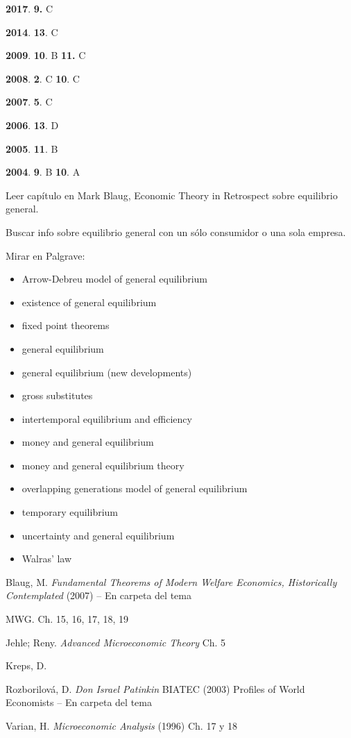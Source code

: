 \documentclass{nuevotema}
\begin{document}
\textbf{2017}. \textbf{9.} C

\textbf{2014}. \textbf{13}. C

\textbf{2009}. \textbf{10}. B \textbf{11.} C

\textbf{2008}. \textbf{2}. C \textbf{10}. C

\textbf{2007}. \textbf{5}. C

\textbf{2006}. \textbf{13}. D

\textbf{2005}. \textbf{11}. B

\textbf{2004}. \textbf{9}. B \textbf{10}. A

Leer capítulo en Mark Blaug, Economic Theory in Retrospect sobre equilibrio general.

Buscar info sobre equilibrio general con un sólo consumidor o una sola empresa.

\bibliografia

Mirar en Palgrave:
\begin{itemize}
	\item Arrow-Debreu model of general equilibrium
	\item existence of general equilibrium
	\item fixed point theorems
	\item general equilibrium
	\item general equilibrium (new developments)
	\item gross substitutes
	\item intertemporal equilibrium and efficiency
	\item money and general equilibrium
	\item money and general equilibrium theory
	\item overlapping generations model of general equilibrium
	\item temporary equilibrium
	\item uncertainty and general equilibrium
	\item Walras' law
\end{itemize}

Blaug, M. \textit{Fundamental Theorems of Modern Welfare Economics, Historically Contemplated} (2007) -- En carpeta del tema

MWG. Ch. 15, 16, 17, 18, 19

Jehle; Reny. \textit{Advanced Microeconomic Theory} Ch. 5

Kreps, D. 

Rozborilová, D. \textit{Don Israel Patinkin} BIATEC (2003) Profiles of World Economists -- En carpeta del tema

Varian, H. \textit{Microeconomic Analysis} (1996) Ch. 17 y 18
\end{document}
